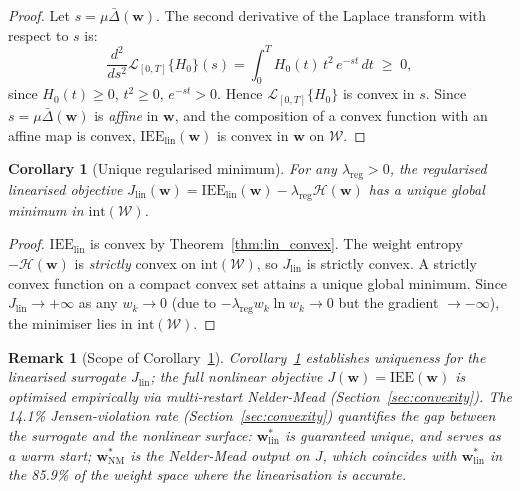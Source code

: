 \documentclass[review,12pt]{elsarticle}
\newcommand{\bfw}{\mathbf{w}}
\newcommand{\IEE}{\mathrm{IEE}}
\newtheorem{corollary}{Corollary}
\newtheorem{remark}{Remark}
\begin{document}
\begin{proof}
Let $s = \mu\bar{\Delta}(\bfw)$.  The second derivative of the Laplace transform
with respect to $s$ is:
\begin{equation}
  \frac{d^2}{ds^2}\mathcal{L}_{[0,T]}\{H_0\}(s)
  = \int_0^T H_0(t)\,t^2\,e^{-st}\,dt \;\geq\; 0,
  \label{eq:laplace_convex}
\end{equation}
since $H_0(t)\geq 0$, $t^2\geq 0$, $e^{-st}>0$.  Hence
$\mathcal{L}_{[0,T]}\{H_0\}$ is convex in $s$.
Since $s = \mu\bar{\Delta}(\bfw)$ is \emph{affine} in $\bfw$, and the composition
of a convex function with an affine map is convex,
$\IEE_{\mathrm{lin}}(\bfw)$ is convex in $\bfw$ on $\mathcal{W}$.
\end{proof}

\begin{corollary}[Unique regularised minimum]
\label{cor:unique}
For any $\lambda_{\mathrm{reg}} > 0$, the regularised linearised objective
$J_{\mathrm{lin}}(\bfw) = \IEE_{\mathrm{lin}}(\bfw) - \lambda_{\mathrm{reg}}\mathcal{H}(\bfw)$
has a unique global minimum in $\mathrm{int}(\mathcal{W})$.
\end{corollary}

\begin{proof}
$\IEE_{\mathrm{lin}}$ is convex by Theorem~\ref{thm:lin_convex}.
The weight entropy $-\mathcal{H}(\bfw)$ is \emph{strictly} convex on
$\mathrm{int}(\mathcal{W})$, so $J_{\mathrm{lin}}$ is strictly convex.
A strictly convex function on a compact convex set attains a unique
global minimum.  Since $J_{\mathrm{lin}} \to +\infty$ as any
$w_k \to 0$ (due to $-\lambda_{\mathrm{reg}} w_k \ln w_k \to 0$ but
the gradient $\to -\infty$), the minimiser lies in
$\mathrm{int}(\mathcal{W})$.
\end{proof}

\begin{remark}[Scope of Corollary~\ref{cor:unique}]
\label{rem:corollary_scope}
Corollary~\ref{cor:unique} establishes uniqueness for the
\emph{linearised} surrogate $J_{\mathrm{lin}}$; the full nonlinear
objective $J(\bfw) = \IEE(\bfw)$ is optimised empirically via
multi-restart Nelder-Mead (Section~\ref{sec:convexity}).
The 14.1\% Jensen-violation rate (Section~\ref{sec:convexity})
quantifies the gap between the surrogate and the nonlinear surface:
$\bfw^*_{\mathrm{lin}}$ is guaranteed unique, and serves as a warm
start; $\bfw^*_{\mathrm{NM}}$ is the Nelder-Mead output on $J$, which
coincides with $\bfw^*_{\mathrm{lin}}$ in the 85.9\% of the weight
space where the linearisation is accurate.
\end{remark}
\end{document}
